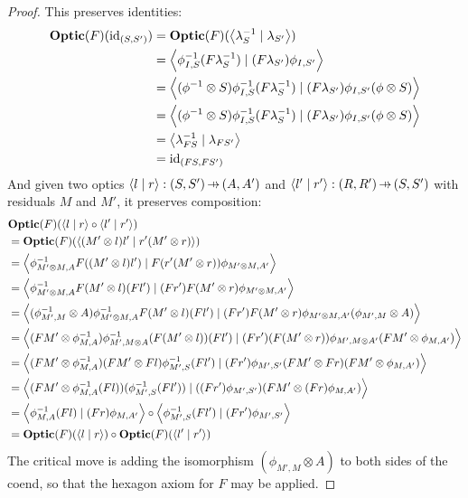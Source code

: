 \documentclass[11pt,letterpaper]{article}
\theoremstyle{plain}
\theoremstyle{definition}
\newcommand{\Optic}{\mathbf{Optic}}
\newcommand{\id}{\mathrm{id}}
\newcommand{\rep}[2]{{\ensuremath \left\langle #1 \mid #2 \right\rangle}}
\newcommand{\hto}{\ensuremath{\,\mathaccent\shortmid\rightarrow\,}}
\begin{document}
\begin{proof}
  This preserves identities:
  \begin{align*}
  \Optic(F)(\id_{(S, S')})
  &= \Optic(F)(\rep{\lambda^{-1}_S}{\lambda_{S'}}) \\
  &= \rep{\phi^{-1}_{I,S} (F\lambda^{-1}_S)}{(F\lambda_{S'}) \phi_{I,S'}} \\
  &= \rep{(\phi^{-1} \otimes S) \phi^{-1}_{I,S} (F\lambda^{-1}_S)}{(F\lambda_{S'}) \phi_{I,S'}(\phi \otimes S) } \\
  &= \rep{(\phi^{-1} \otimes S) \phi^{-1}_{I,S} (F\lambda^{-1}_S)}{(F\lambda_{S'}) \phi_{I,S'}(\phi \otimes S) } \\
  &= \rep{\lambda^{-1}_{FS}}{\lambda_{FS'}} \\
  &= \id_{(FS, FS')}
  \end{align*}
  And given two optics $\rep{l}{r} : (S, S') \hto (A, A')$ and $\rep{l'}{r'} : (R, R') \hto (S, S')$ with residuals $M$ and $M'$, it preserves composition:
\begin{align*}
&\Optic(F)(\rep{l}{r} \circ \rep{l'}{r'})  \\
&= \Optic(F)(\rep{(M' \otimes l)l'}{r'(M' \otimes r)}) \\
&= \rep{\phi^{-1}_{M' \otimes M,A} F((M' \otimes l)l')}{F(r'(M' \otimes r)) \phi_{M' \otimes M,A'}} \\
&= \rep{\phi^{-1}_{M' \otimes M,A} F(M' \otimes l)(Fl')}{(Fr') F(M' \otimes r) \phi_{M' \otimes M,A'}} \\
&= \rep{(\phi^{-1}_{M', M} \otimes A)\phi^{-1}_{M' \otimes M,A} F(M' \otimes l)(Fl')}{(Fr') F(M' \otimes r) \phi_{M' \otimes M,A'}(\phi_{M', M} \otimes A)} \\
&= \rep{(FM' \otimes \phi^{-1}_{M,A})\phi^{-1}_{M',M \otimes A}(F(M' \otimes l)) (Fl')}{(Fr') (F(M' \otimes r)) \phi_{M',M \otimes A'}  (FM' \otimes \phi_{M,A'})} \\
&= \rep{(FM' \otimes \phi^{-1}_{M,A})(FM' \otimes Fl)\phi^{-1}_{M',S} (Fl')}{(Fr') \phi_{M',S'} (FM' \otimes Fr) (FM' \otimes \phi_{M,A'})} \\
&= \rep{(FM' \otimes \phi^{-1}_{M,A} (Fl))(\phi^{-1}_{M',S} (Fl'))}{((Fr') \phi_{M',S'})(FM' \otimes (Fr) \phi_{M,A'})} \\
&= \rep{\phi^{-1}_{M,A} (Fl)}{(Fr) \phi_{M,A'}} \circ \rep{\phi^{-1}_{M',S} (Fl')}{(Fr') \phi_{M',S'}} \\
&= \Optic(F)(\rep{l}{r}) \circ \Optic(F)(\rep{l'}{r'})
\end{align*}
The critical move is adding the isomorphism $(\phi_{M', M} \otimes A)$ to both sides of the coend, so that the hexagon axiom for $F$ may be applied.
\end{proof}
\end{document}
